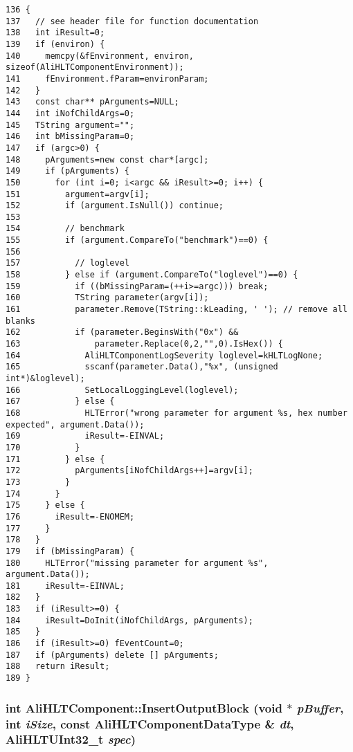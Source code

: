 \footnotesize\begin{verbatim}136 {
137   // see header file for function documentation
138   int iResult=0;
139   if (environ) {
140     memcpy(&fEnvironment, environ, sizeof(AliHLTComponentEnvironment));
141     fEnvironment.fParam=environParam;
142   }
143   const char** pArguments=NULL;
144   int iNofChildArgs=0;
145   TString argument="";
146   int bMissingParam=0;
147   if (argc>0) {
148     pArguments=new const char*[argc];
149     if (pArguments) {
150       for (int i=0; i<argc && iResult>=0; i++) {
151         argument=argv[i];
152         if (argument.IsNull()) continue;
153 
154         // benchmark
155         if (argument.CompareTo("benchmark")==0) {
156 
157           // loglevel
158         } else if (argument.CompareTo("loglevel")==0) {
159           if ((bMissingParam=(++i>=argc))) break;
160           TString parameter(argv[i]);
161           parameter.Remove(TString::kLeading, ' '); // remove all blanks
162           if (parameter.BeginsWith("0x") &&
163               parameter.Replace(0,2,"",0).IsHex()) {
164             AliHLTComponentLogSeverity loglevel=kHLTLogNone;
165             sscanf(parameter.Data(),"%x", (unsigned int*)&loglevel);
166             SetLocalLoggingLevel(loglevel);
167           } else {
168             HLTError("wrong parameter for argument %s, hex number expected", argument.Data());
169             iResult=-EINVAL;
170           }
171         } else {
172           pArguments[iNofChildArgs++]=argv[i];
173         }
174       }
175     } else {
176       iResult=-ENOMEM;
177     }
178   }
179   if (bMissingParam) {
180     HLTError("missing parameter for argument %s", argument.Data());
181     iResult=-EINVAL;
182   }
183   if (iResult>=0) {
184     iResult=DoInit(iNofChildArgs, pArguments);
185   }
186   if (iResult>=0) fEventCount=0;
187   if (pArguments) delete [] pArguments;
188   return iResult;
189 }
\end{verbatim}\normalsize 


\subsubsection{\setlength{\rightskip}{0pt plus 5cm}int Ali\-HLTComponent::Insert\-Output\-Block (void $\ast$ {\em p\-Buffer}, int {\em i\-Size}, const {\bf Ali\-HLTComponent\-Data\-Type} \& {\em dt}, {\bf Ali\-HLTUInt32\_\-t} {\em spec})\hspace{0.3cm}{\tt  [private]}}\label{classAliHLTComponent_d6}


